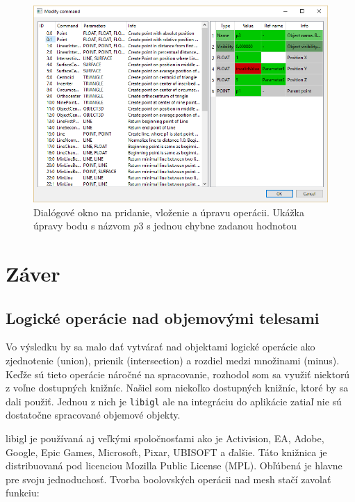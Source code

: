 \begin{figure}[hbt]
	\centering
	\includegraphics[width=1\textwidth]{obrazky-figures/Dialog.png}
	\caption{Dialógové okno na pridanie, vloženie a úpravu operácii. Ukážka úpravy bodu s názvom $p3$ s jednou chybne zadanou hodnotou }
	\label{fig:dialogWindow}
\end{figure}

\chapter{Záver}

\section{Logické operácie nad objemovými telesami}
Vo výsledku by sa malo dať vytvárať nad objektami logické operácie ako zjednotenie (union), prienik (intersection) a rozdiel medzi množinami (minus). Keďže sú tieto operácie náročné na spracovanie, rozhodol som sa využiť niektorú z voľne dostupných knižníc. Našiel som niekoľko dostupných knižníc, ktoré by sa dali použiť. Jednou z nich je \texttt{libigl}\cite{libigl} ale na integráciu do aplikácie zatiaľ nie sú dostatočne spracované objemové objekty.

libigl je používaná aj veľkými spoločnosťami ako je Activision, EA, Adobe, Google, Epic Games, Microsoft, Pixar, UBISOFT a ďalšie. Táto knižnica je distribuovaná pod licenciou Mozilla Public License (MPL).
Obľúbená je hlavne pre svoju jednoduchosť. Tvorba boolovských operácii nad mesh stačí zavolať funkciu: 

